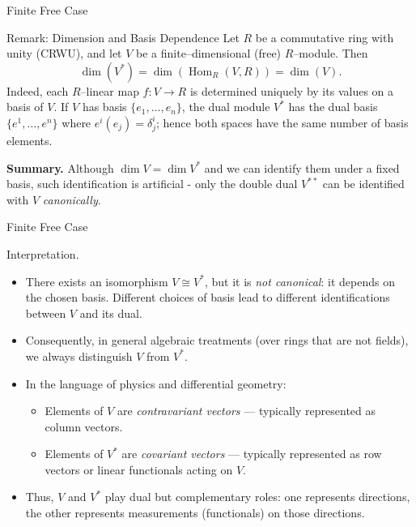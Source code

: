 \begin{frame}{Finite Free Case}

\begin{block}{Remark: Dimension and Basis Dependence}
Let $R$ be a commutative ring with unity (CRWU), and let $V$ be a finite--dimensional (free) $R$--module.  
Then
\[
\dim(V^*) = \dim\left(\operatorname{Hom}_R(V, R)\right) = \dim(V).
\]
Indeed, each $R$--linear map $f:V\to R$ is determined uniquely by its values on a basis of $V$.  
If $V$ has basis $\{e_1,\dots,e_n\}$, the dual module $V^*$ has the dual basis $\{e^1,\dots,e^n\}$ where $e^i(e_j)=\delta^i_j$; hence both spaces have the same number of basis elements.
\end{block}
\textbf{Summary.}
Although $\dim V = \dim V^*$ and we can identify them under a fixed basis, such identification is artificial - only the double dual $V^{**}$ can be identified with $V$ \emph{canonically}.
\end{frame}

\begin{frame}{Finite Free Case}
\vspace{-0.2cm}
\begin{block}{Interpretation.}
\begin{itemize}
  \item There exists an isomorphism $V\cong V^*$, but it is \emph{not canonical}: it depends on the chosen basis. Different choices of basis lead to different identifications between $V$ and its dual.
  \item Consequently, in general algebraic treatments (over rings that are not fields), we always distinguish $V$ from $V^*$.
  \item In the language of physics and differential geometry:
  \begin{itemize}
    \item Elements of $V$ are \emph{contravariant vectors} — typically represented as column vectors.
    \item Elements of $V^*$ are \emph{covariant vectors} — typically represented as row vectors or linear functionals acting on $V$.
  \end{itemize}
  \item Thus, $V$ and $V^*$ play dual but complementary roles: one represents directions, the other represents measurements (functionals) on those directions.
\end{itemize}
\end{block}

\end{frame}

